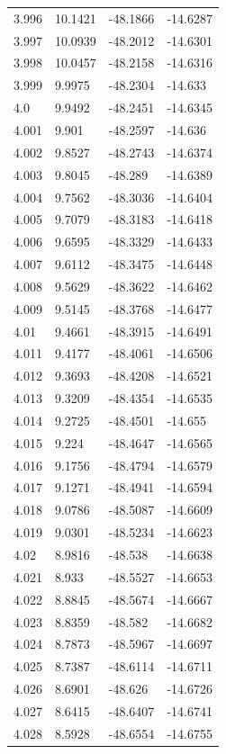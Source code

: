 \begin{tabular}{llll}
3.996 & 10.1421 & -48.1866 & -14.6287 \\
3.997 & 10.0939 & -48.2012 & -14.6301 \\
3.998 & 10.0457 & -48.2158 & -14.6316 \\
3.999 & 9.9975 & -48.2304 & -14.633 \\
4.0 & 9.9492 & -48.2451 & -14.6345 \\
4.001 & 9.901 & -48.2597 & -14.636 \\
4.002 & 9.8527 & -48.2743 & -14.6374 \\
4.003 & 9.8045 & -48.289 & -14.6389 \\
4.004 & 9.7562 & -48.3036 & -14.6404 \\
4.005 & 9.7079 & -48.3183 & -14.6418 \\
4.006 & 9.6595 & -48.3329 & -14.6433 \\
4.007 & 9.6112 & -48.3475 & -14.6448 \\
4.008 & 9.5629 & -48.3622 & -14.6462 \\
4.009 & 9.5145 & -48.3768 & -14.6477 \\
4.01 & 9.4661 & -48.3915 & -14.6491 \\
4.011 & 9.4177 & -48.4061 & -14.6506 \\
4.012 & 9.3693 & -48.4208 & -14.6521 \\
4.013 & 9.3209 & -48.4354 & -14.6535 \\
4.014 & 9.2725 & -48.4501 & -14.655 \\
4.015 & 9.224 & -48.4647 & -14.6565 \\
4.016 & 9.1756 & -48.4794 & -14.6579 \\
4.017 & 9.1271 & -48.4941 & -14.6594 \\
4.018 & 9.0786 & -48.5087 & -14.6609 \\
4.019 & 9.0301 & -48.5234 & -14.6623 \\
4.02 & 8.9816 & -48.538 & -14.6638 \\
4.021 & 8.933 & -48.5527 & -14.6653 \\
4.022 & 8.8845 & -48.5674 & -14.6667 \\
4.023 & 8.8359 & -48.582 & -14.6682 \\
4.024 & 8.7873 & -48.5967 & -14.6697 \\
4.025 & 8.7387 & -48.6114 & -14.6711 \\
4.026 & 8.6901 & -48.626 & -14.6726 \\
4.027 & 8.6415 & -48.6407 & -14.6741 \\
4.028 & 8.5928 & -48.6554 & -14.6755 \\

\end{tabular}
